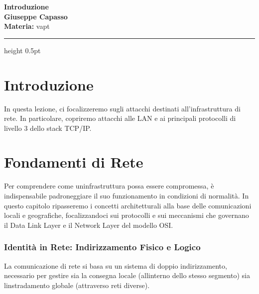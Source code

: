 \documentclass[11pt,a4paper]{article}
\newcommand{\proposaltitle}[1]{
    \begin{center}
        \vspace*{0.1cm}
        {\LARGE \bfseries \color{blue} #1} \\[1.5ex]
        {\large \textbf{Giuseppe Capasso}} \\[1ex]
                \small{
            \vspace{0.1cm}
            \textbf{Materia:} vapt\\
        }
            \end{center}
    \vspace{0.3cm}
    \hrule height 0.5pt
    \vspace{0.5cm}
}
\begin{document}
\proposaltitle{Introduzione}

\section{Introduzione}\label{introduzione}

In questa lezione, ci focalizzeremo sugli attacchi destinati
all'infrastruttura di rete. In particolare, copriremo attacchi alle LAN
e ai principali protocolli di livello 3 dello stack TCP/IP.

\section{Fondamenti di Rete}\label{fondamenti-di-rete}

Per comprendere come un\textquotesingle infrastruttura possa essere
compromessa, è indispensabile padroneggiare il suo funzionamento in
condizioni di normalità. In questo capitolo ripasseremo i concetti
architetturali alla base delle comunicazioni locali e geografiche,
focalizzandoci sui protocolli e sui meccanismi che governano il Data
Link Layer e il Network Layer del modello OSI.

\subsubsection{Identità in Rete: Indirizzamento Fisico e
Logico}\label{identituxe0-in-rete-indirizzamento-fisico-e-logico}

La comunicazione di rete si basa su un sistema di doppio indirizzamento,
necessario per gestire sia la consegna locale
(all\textquotesingle interno dello stesso segmento) sia
l\textquotesingle instradamento globale (attraverso reti diverse).
\end{document}
